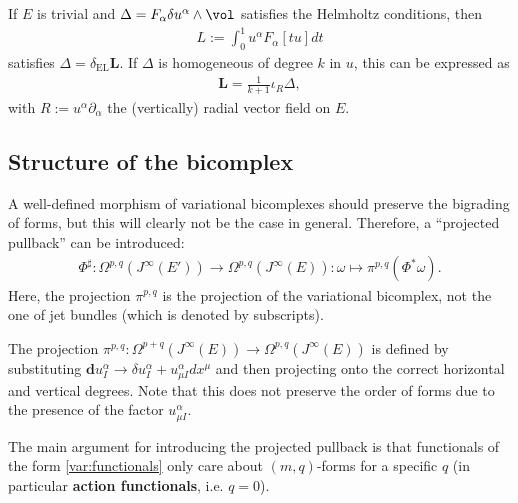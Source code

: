     \begin{example}
        If $E$ is trivial and $\Delta=F_\alpha\delta u^\alpha\wedge\vol$ satisfies the Helmholtz conditions, then
        \begin{gather}
            \label{var:trivial_helmholtz}
            L := \int_0^1 u^\alpha F_\alpha[tu]dt
        \end{gather}
        satisfies $\Delta=\delta_\mathrm{EL}\mathbf{L}$. If $\Delta$ is homogeneous of degree $k$ in $u$, this can be expressed as
        \begin{gather}
            \mathbf{L} = \frac{1}{k+1}\iota_R\Delta,
        \end{gather}
        with $R:=u^\alpha\partial_\alpha$ the (vertically) radial vector field on $E$.
    \end{example}

\subsection{Structure of the bicomplex}

    A well-defined morphism of variational bicomplexes should preserve the bigrading of forms, but this will clearly not be the case in general. Therefore, a ``projected pullback'' can be introduced:
    \begin{gather}
        \Phi^\sharp:\Omega^{p,q}(J^\infty(E'))\rightarrow\Omega^{p,q}(J^\infty(E)):\omega\mapsto\pi^{p,q}(\Phi^*\omega).
    \end{gather}
    Here, the projection $\pi^{p,q}$ is the projection of the variational bicomplex, not the one of jet bundles (which is denoted by subscripts).
    \begin{remark}\label{var:degree_raise_remark}
        The projection $\pi^{p,q}:\Omega^{p+q}(J^\infty(E))\rightarrow\Omega^{p,q}(J^\infty(E))$ is defined by substituting $\mathbf{d}u^\alpha_I\longrightarrow\delta u^\alpha_I + u^\alpha_{\mu I}dx^\mu$ and then projecting onto the correct horizontal and vertical degrees. Note that this does not preserve the order of forms due to the presence of the factor $u^\alpha_{\mu I}$.
    \end{remark}

    The main argument for introducing the projected pullback is that functionals of the form \eqref{var:functionals} only care about $(m,q)$-forms for a specific $q$ (in particular \textbf{action functionals}, i.e. $q=0$).

